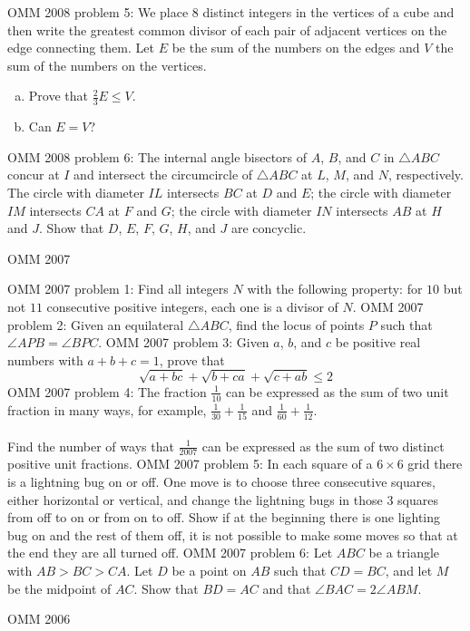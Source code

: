OMM 2008 problem 5:  We place $8$ distinct integers in the vertices of a cube and then write the greatest common divisor of each pair of adjacent vertices on the edge connecting them. Let $E$ be the sum of the numbers on the edges and $V$ the sum of the numbers on the vertices.
\begin{enumerate}[a)]
  \item Prove that $\frac23E\le V$.
  \item Can $E=V$?
\end{enumerate} 
OMM 2008 problem 6:  The internal angle bisectors of $A$, $B$, and $C$ in $\triangle ABC$ concur at $I$ and intersect the circumcircle of $\triangle ABC$ at $L$, $M$, and $N$, respectively. The circle with diameter $IL$ intersects $BC$ at $D$ and $E$; the circle with diameter $IM$ intersects $CA$ at $F$ and $G$; the circle with diameter $IN$ intersects $AB$ at $H$ and $J$. Show that $D$, $E$, $F$, $G$, $H$, and $J$ are concyclic. 

OMM 2007 

OMM 2007 problem 1:  Find all integers $N$ with the following property: for $10$ but not $11$ consecutive positive integers, each one is a divisor of $N$. 
OMM 2007 problem 2:  Given an equilateral $\triangle ABC$, find the locus of points $P$ such that $\angle APB=\angle BPC$. 
OMM 2007 problem 3:  Given $a$, $b$, and $c$ be positive real numbers with $a+b+c=1$, prove that
\[ \sqrt{a+bc}+\sqrt{b+ca}+\sqrt{c+ab}\le2 \] 
OMM 2007 problem 4:  The fraction $\frac1{10}$ can be expressed as the sum of two unit fraction in many ways, for example, $\frac1{30}+\frac1{15}$ and $\frac1{60}+\frac1{12}$. \\\\
Find the number of ways that $\frac1{2007}$ can be expressed as the sum of two distinct positive unit fractions. 
OMM 2007 problem 5:  In each square of a $6\times6$ grid there is a lightning bug on or off. One move is to choose three consecutive squares, either horizontal or vertical, and change the lightning bugs in those $3$ squares from off to on or from on to off. Show if at the beginning there is one lighting bug on and the rest of them off, it is not possible to make some moves so that at the end they are all turned off. 
OMM 2007 problem 6:  Let $ABC$ be a triangle with $AB>BC>CA$. Let $D$ be a point on $AB$ such that $CD=BC$, and let $M$ be the midpoint of $AC$. Show that $BD=AC$ and that $\angle BAC=2\angle ABM.$ 

OMM 2006 


